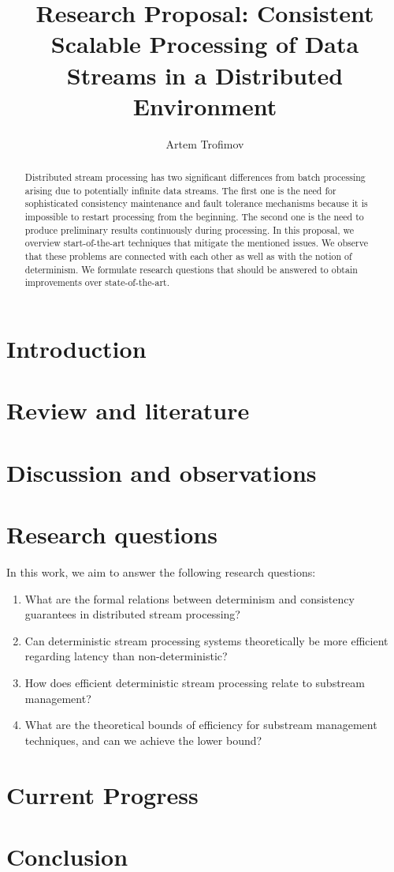 \documentclass[runningheads]{llncs}
\begin{document}
\title {Research Proposal: Consistent Scalable Processing of Data Streams in  a Distributed Environment
}
\author{Artem Trofimov}

\maketitle

\begin{abstract}
Distributed stream processing has two significant differences from batch processing arising due to potentially infinite data streams. The first one is the need for sophisticated consistency maintenance and fault tolerance mechanisms because it is impossible to restart processing from the beginning. The second one is the need to produce preliminary results continuously during processing. In this proposal, we overview start-of-the-art techniques that mitigate the mentioned issues. We observe that these problems are connected with each other as well as with the notion of determinism. We formulate research questions that should be answered to obtain improvements over state-of-the-art. 
\end{abstract}

\section {Introduction}

\section {Review and literature}


\section {Discussion and observations}

\section {Research questions}

In this work, we aim to answer the following research questions:
\begin{enumerate}
    \item What are the formal relations between determinism and consistency guarantees in distributed stream processing?
    \item Can deterministic stream processing systems theoretically be more efficient regarding latency than non-deterministic? 
    \item How does efficient deterministic stream processing relate to substream management?
    \item What are the theoretical bounds of efficiency for substream management techniques, and can we achieve the lower bound?
\end{enumerate}

\section {Current Progress}

\section {Conclusion}




\end{document}

